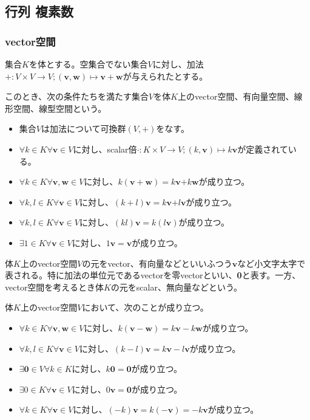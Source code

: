 \documentclass[dvipdfmx]{jsarticle}
\begin{document}
\subsection{行列 複素数}%
\subsubsection{vector空間}%
\begin{axs}[vector空間の公理]
集合$K$を体とする。空集合でない集合$V$に対し、加法$+ :V \times V \rightarrow V;\left( \mathbf{v},\mathbf{w} \right) \mapsto \mathbf{v} + \mathbf{w}$が与えられたとする。\par
このとき、次の条件たちを満たす集合$V$を体$K$上のvector空間、有向量空間、線形空間、線型空間という。
\begin{itemize}
\item
  集合$V$は加法について可換群$(V, + )$をなす。
\item
  $\forall k \in K\forall\mathbf{v} \in V$に対し、scalar倍$\cdot :K \times V \rightarrow V;\left( k,\mathbf{v} \right) \mapsto k\mathbf{v}$が定義されている。
\item
  $\forall k \in K\forall\mathbf{v},\mathbf{w} \in V$に対し、$k\left( \mathbf{v} + \mathbf{w} \right) = k\mathbf{v}\mathbf{+}k\mathbf{w}$が成り立つ。
\item
  $\forall k,l \in K\forall\mathbf{v} \in V$に対し、$(k + l)\mathbf{v} = k\mathbf{v}\mathbf{+}l\mathbf{v}$が成り立つ。
\item
  $\forall k,l \in K\forall\mathbf{v} \in V$に対し、$(kl)\mathbf{v} = k\left( l\mathbf{v} \right)$が成り立つ。
\item
  $\exists 1 \in K\forall\mathbf{v} \in V$に対し、$1\mathbf{v} = \mathbf{v}$が成り立つ。
\end{itemize}
体$K$上のvector空間$V$の元をvector、有向量などといいふつう$\mathbf{v}$など小文字太字で表される。特に加法の単位元であるvectorを零vectorといい、\textbf{0}と表す。一方、vector空間を考えるとき体$K$の元をscalar、無向量などという。
\end{axs}
\begin{thm}\label{4.1.2.1} 体$K$上のvector空間$V$において、次のことが成り立つ。
\begin{itemize}
\item
  $\forall k \in K\forall\mathbf{v},\mathbf{w} \in V$に対し、$k\left( \mathbf{v}-\mathbf{w} \right) = k\mathbf{v}-k\mathbf{w}$が成り立つ。
\item
  $\forall k,l \in K\forall\mathbf{v} \in V$に対し、$(k - l)\mathbf{v} = k\mathbf{v} - l\mathbf{v}$が成り立つ。
\item
  $\exists\mathbf{0} \in V\forall k \in K$に対し、$k\mathbf{0} = \mathbf{0}$が成り立つ。
\item
  $\exists 0 \in K\forall\mathbf{v} \in V$に対し、$0\mathbf{v} = \mathbf{0}$が成り立つ。
\item
  $\forall k \in K\forall\mathbf{v} \in V$に対し、$( - k)\mathbf{v} = k\left( - \mathbf{v} \right) = - k\mathbf{v}$が成り立つ。
\end{itemize}
\end{thm}
\end{document}
